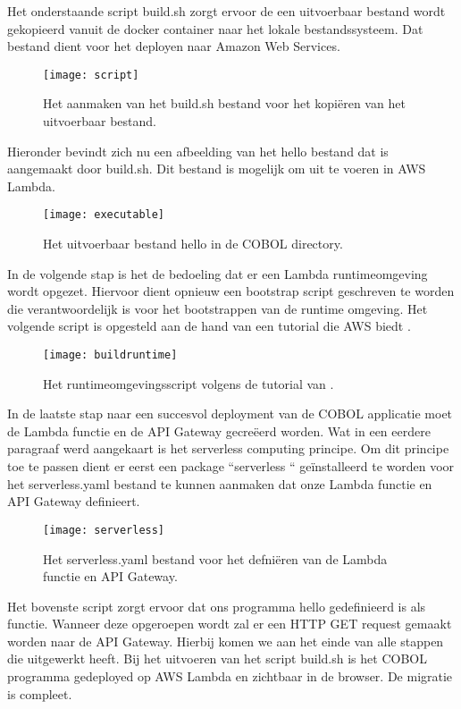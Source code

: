 \newpage
Het onderstaande script build.sh zorgt ervoor de een uitvoerbaar bestand wordt gekopieerd vanuit de docker container naar het lokale bestandssysteem. Dat bestand dient voor het deployen naar Amazon Web Services. 

  \begin{figure}[h]
    \centering
    \texttt{[image: script]}
    \caption{Het aanmaken van het build.sh bestand voor het kopiëren van het uitvoerbaar bestand.}
\end{figure}

Hieronder bevindt zich nu een afbeelding van het hello bestand dat is aangemaakt door build.sh. Dit bestand is mogelijk om uit te voeren in AWS Lambda.

  \begin{figure}[h]
    \centering
    \texttt{[image: executable]}
    \caption{Het uitvoerbaar bestand hello in de COBOL directory.}
\end{figure}

\newpage
In de volgende stap is het de bedoeling dat er een Lambda runtimeomgeving wordt opgezet. Hiervoor dient opnieuw een bootstrap script geschreven te worden die verantwoordelijk is voor het bootstrappen van de runtime omgeving. Het volgende script is opgesteld aan de hand van een tutorial die AWS biedt \autocite{AWS2022}. 

 \begin{figure}[h]
    \centering
    \texttt{[image: buildruntime]}
    \caption{Het runtimeomgevingsscript volgens de tutorial van \autocite{AWS2022}.}
\end{figure}

In de laatste stap naar een succesvol deployment van de COBOL applicatie moet de Lambda functie en de API Gateway gecreëerd worden. Wat in een eerdere paragraaf werd aangekaart is het serverless computing principe. Om dit principe toe te passen dient er eerst een package ``serverless `` geïnstalleerd te worden voor het serverless.yaml bestand te kunnen aanmaken dat onze Lambda functie en API Gateway definieert. 

 \begin{figure}[h]
    \centering
    \texttt{[image: serverless]}
    \caption{Het serverless.yaml bestand voor het defniëren van de Lambda functie en API Gateway.}
\end{figure}

\newpage

Het bovenste script zorgt ervoor dat ons programma hello gedefinieerd is als functie. Wanneer deze opgeroepen wordt zal er een HTTP GET request gemaakt worden naar de API Gateway. Hierbij komen we aan het einde van alle stappen die \textcite{Paika2020} uitgewerkt heeft. Bij het uitvoeren van het script build.sh is het COBOL programma gedeployed op AWS Lambda en zichtbaar in de browser. De migratie is compleet.

